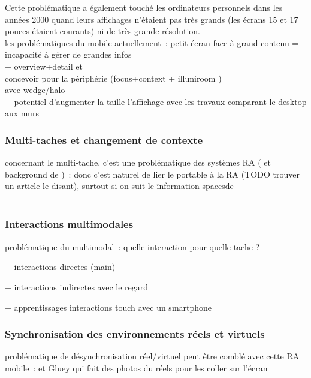 Cette problématique a également touché les ordinateurs personnels dans les années 2000 quand leurs affichages n'étaient pas très grands (les écrans 15 et 17 pouces étaient courants) ni de très grande résolution. \\
les problématiques du mobile actuellement~: petit écran face à grand contenu = incapacité à gérer de grandes infos \\
+ overview+detail \cite{BergeSerranoPerelmanEtAl2014} et \cite{RashidNacentaQuigley2012}\\
concevoir pour la périphérie (focus+context \cite{CockburnKarlsonBederson2009}
+ illuniroom \cite{JonesBenkoOfekEtAl2013}) \\
avec wedge/halo \cite{BaudischRosenholtz2003} \cite{GustafsonBaudischGutwinEtAl2008} \cite{BurigatChittaro2011} \\
+ potentiel d'augmenter la taille l'affichage avec les travaux comparant le desktop aux murs \cite{LiuChapuisBeaudouin-LafonEtAl2014} \cite{ShuppBallYostEtAl2006} \cite{TanGergleScupelliEtAl2003}


\subsubsection*{Multi-taches et changement de contexte}
concernant le multi-tache, c'est une problématique des systèmes RA (\cite{SchmalstiegFuhrmannHesinaEtAl2002} et background de \cite{EnsFinneganIrani2014})~: donc c'est naturel de lier le portable à la RA (TODO trouver un article le disant), surtout si on suit le \"information spaces\" de \cite{EnsHincapie-RamosIrani2014} \\
\cite{TanCzerwinski2003} \\
\cite{RashidNacentaQuigley2012a}


\subsubsection*{Interactions multimodales}
problématique du multimodal~: quelle interaction pour quelle tache ?

+ interactions directes (main)

+ interactions indirectes avec le regard

+ apprentissages interactions touch avec un smartphone


\subsubsection*{Synchronisation des environnements réels et virtuels}
problématique de désynchronisation réel/virtuel peut être comblé avec cette RA mobile~: \cite{Chalon2004} et Gluey qui fait des photos du réels pour les coller sur l'écran


